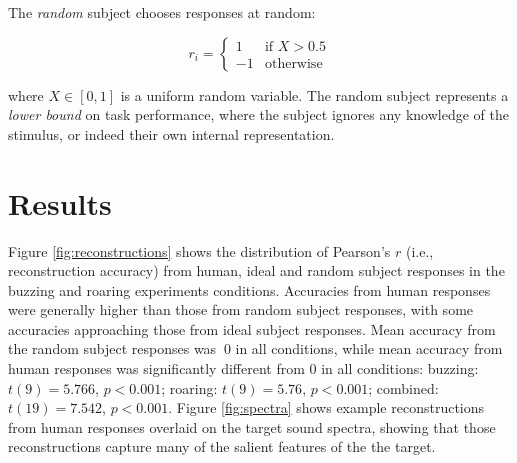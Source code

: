 \documentclass[journal]{IEEEtran}
\begin{document}
The \textit{random} subject chooses responses at random:

\begin{equation}
    r_i =
    \begin{cases}
        1 & \text{if  } X > 0.5 \\
        -1 & \text{otherwise}
    \end{cases}
\end{equation}

where $X \in [0, 1]$ is a uniform random variable.
The random subject represents a \textit{lower bound} on task performance,
where the subject ignores any knowledge of the stimulus, or indeed their own internal representation.

\section{Results}

Figure \ref{fig:reconstructions} shows the distribution of Pearson's $r$ (i.e., reconstruction accuracy) from human, ideal and random subject responses in the buzzing and roaring experiments conditions.
Accuracies from human responses were generally higher than those from random subject responses,
with some accuracies approaching those from ideal subject responses.
Mean accuracy from the random subject responses was $~0$ in all conditions,
while mean accuracy from human responses was significantly different from $0$ in all conditions: buzzing: $t(9) = 5.766$, $p < 0.001$; roaring: $t(9) = 5.76$, $p < 0.001$; combined: $t(19) = 7.542$, $p < 0.001$.
Figure \ref{fig:spectra} shows example reconstructions from human responses overlaid on the target sound spectra,
showing that those reconstructions capture many of the salient features of the the target.
\end{document}
